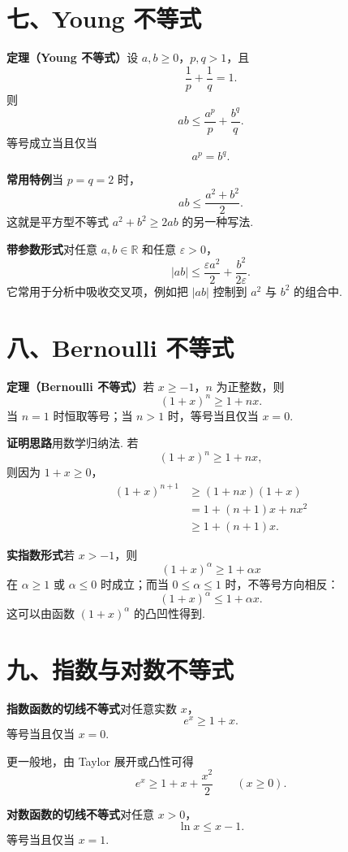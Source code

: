 \documentclass[UTF8,12pt,a4paper,fontset=fandol]{ctexart}
\begin{document}
\section*{七、Young 不等式}

\noindent\textbf{定理（Young 不等式）}\quad 设 $a,b\ge0$，$p,q>1$，且
\[
  \frac1p+\frac1q=1.
\]
则
\[
  ab\le \frac{a^p}{p}+\frac{b^q}{q}.
\]
等号成立当且仅当
\[
  a^p=b^q.
\]

\noindent\textbf{常用特例}\quad 当 $p=q=2$ 时，
\[
  ab\le \frac{a^2+b^2}{2}.
\]
这就是平方型不等式 $a^2+b^2\ge2ab$ 的另一种写法.

\noindent\textbf{带参数形式}\quad 对任意 $a,b\in\mathbb R$ 和任意 $\varepsilon>0$，
\[
  |ab|\le \frac{\varepsilon a^2}{2}+\frac{b^2}{2\varepsilon}.
\]
它常用于分析中吸收交叉项，例如把 $|ab|$ 控制到 $a^2$ 与 $b^2$ 的组合中.

\section*{八、Bernoulli 不等式}

\noindent\textbf{定理（Bernoulli 不等式）}\quad 若 $x\ge -1$，$n$ 为正整数，则
\[
  (1+x)^n\ge1+nx.
\]
当 $n=1$ 时恒取等号；当 $n>1$ 时，等号当且仅当 $x=0$.

\noindent\textbf{证明思路}\quad 用数学归纳法. 若
\[
  (1+x)^n\ge1+nx,
\]
则因为 $1+x\ge0$，
\[
\begin{aligned}
  (1+x)^{n+1}
  &\ge (1+nx)(1+x)\\
  &=1+(n+1)x+nx^2\\
  &\ge1+(n+1)x.
\end{aligned}
\]

\noindent\textbf{实指数形式}\quad 若 $x>-1$，则
\[
  (1+x)^\alpha\ge1+\alpha x
\]
在 $\alpha\ge1$ 或 $\alpha\le0$ 时成立；而当 $0\le\alpha\le1$ 时，不等号方向相反：
\[
  (1+x)^\alpha\le1+\alpha x.
\]
这可以由函数 $(1+x)^\alpha$ 的凸凹性得到.

\section*{九、指数与对数不等式}

\noindent\textbf{指数函数的切线不等式}\quad 对任意实数 $x$，
\[
  e^x\ge1+x.
\]
等号当且仅当 $x=0$.

更一般地，由 Taylor 展开或凸性可得
\[
  e^x\ge1+x+\frac{x^2}{2}\qquad(x\ge0).
\]

\noindent\textbf{对数函数的切线不等式}\quad 对任意 $x>0$，
\[
  \ln x\le x-1.
\]
等号当且仅当 $x=1$.
\end{document}
